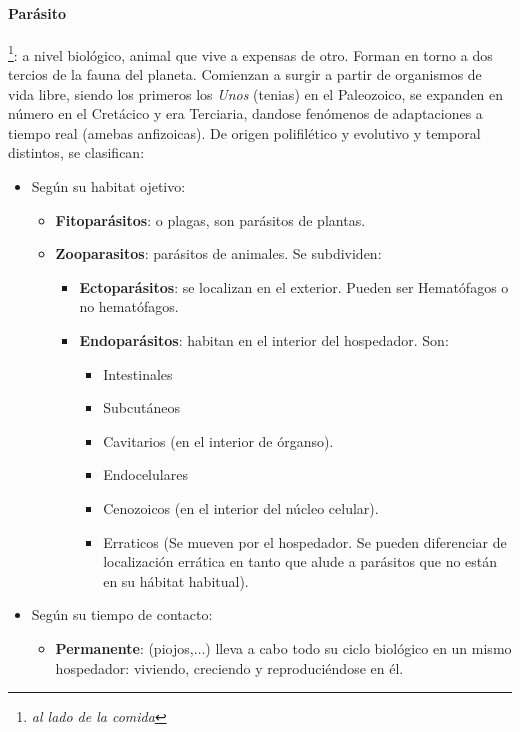 \paragraph{Parásito}\footnote{\textit{al lado de la comida}}: a nivel biológico, animal que vive a expensas de otro. Forman en torno a dos tercios de la fauna del planeta. Comienzan a surgir a partir de organismos de vida libre, siendo los primeros los \textit{Unos} (tenias) en el Paleozoico, se expanden en número en el Cretácico y era Terciaria, dandose fenómenos de adaptaciones a tiempo real (amebas anfizoicas). De origen polifilético y evolutivo y temporal distintos, se clasifican:
\begin{itemize}[itemsep=0pt,parsep=0pt,topsep=0pt,partopsep=0pt]
	\item Según su habitat ojetivo:
	\begin{itemize}[itemsep=0pt,parsep=0pt,topsep=0pt,partopsep=0pt]
		\item \textbf{Fitoparásitos}: o plagas, son parásitos de plantas.
		\item\textbf{Zooparasitos}: parásitos de animales. Se subdividen:
		\begin{itemize}[itemsep=0pt,parsep=0pt,topsep=0pt,partopsep=0pt]
			\item \textbf{Ectoparásitos}: se localizan en el exterior. Pueden ser Hematófagos o no hematófagos.
			\item\textbf{Endoparásitos}: habitan en el interior del hospedador. Son:
			\begin{itemize}[itemsep=0pt,parsep=0pt,topsep=0pt,partopsep=0pt]
				\item Intestinales
				\item Subcutáneos
				\item Cavitarios (en el interior de órganso).
				\item Endocelulares
				\item Cenozoicos (en el interior del núcleo celular).
				\item Erraticos (Se mueven por el hospedador. Se pueden diferenciar de localización errática en tanto que alude a parásitos que no están en su hábitat habitual).
			\end{itemize}
		\end{itemize}
	\end{itemize}
	\item Según su tiempo de contacto:
	\begin{itemize}[itemsep=0pt,parsep=0pt,topsep=0pt,partopsep=0pt]
		\item \textbf{Permanente}: (piojos,$\dots$) lleva a cabo todo su ciclo biológico en un mismo hospedador: viviendo, creciendo y reproduciéndose en él.

\end{itemize}
\end{itemize}
